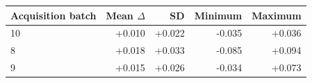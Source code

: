 \begin{tabular}{lrrrr}
\toprule
Acquisition batch & Mean $\Delta$ & SD & Minimum & Maximum \\
\midrule
10 & +0.010 & +0.022 & -0.035 & +0.036 \\
8 & +0.018 & +0.033 & -0.085 & +0.094 \\
9 & +0.015 & +0.026 & -0.034 & +0.073 \\
\bottomrule
\end{tabular}